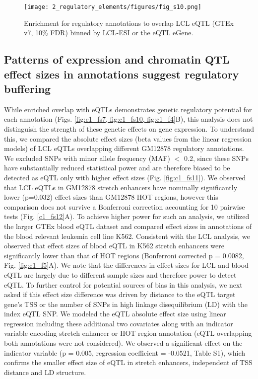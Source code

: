 \begin{figure}
    \centering
    \texttt{[image: 2\_regulatory\_elements/figures/fig\_s10.png]}
    \caption{Enrichment for regulatory annotations to overlap LCL eQTL (GTEx v7, 10\% FDR) binned by LCL-ESI or the eQTL eGene.}
    \label{fig:c1_fs10}
\end{figure}

\subsection{Patterns of expression and chromatin QTL effect sizes in annotations suggest regulatory buffering}
While enriched overlap with eQTLs demonstrates genetic regulatory potential for each annotation (Figs. \ref{fig:c1_fs7, fig:c1_fs10, fig:c1_f4}B), this analysis does not distinguish the strength of these genetic effects on gene expression. To understand this, we compared the absolute effect sizes (beta values from the linear regression models) of LCL eQTLs overlapping different GM12878 regulatory annotations. We excluded SNPs with minor allele frequency (MAF) $<$ 0.2, since these SNPs have substantially reduced statistical power and are therefore biased to be detected as eQTL only with higher effect sizes (Fig. \ref{fig:c1_fs11}). We observed that LCL eQTLs in GM12878 stretch enhancers have nominally significantly lower (p=0.032) effect sizes than GM12878 HOT regions, however this comparison does not survive a Bonferroni correction accounting for 10 pairwise tests (Fig. \ref{c1_fs12}A). To achieve higher power for such an analysis, we utilized the larger GTEx blood eQTL dataset and compared effect sizes in annotations of the blood relevant leukemia cell line K562. Consistent with the LCL analysis, we observed that effect sizes of blood eQTL in K562 stretch enhancers were significantly lower than that of HOT regions (Bonferroni corrected p = 0.0082, Fig. \ref{fig:c1_f5}A). We note that the differences in effect sizes for LCL and blood eQTL are largely due to different sample sizes and therefore power to detect eQTL. To further control for potential sources of bias in this analysis, we next asked if this effect size difference was driven by distance to the eQTL target gene’s TSS or the number of SNPs in high linkage disequilibrium (LD) with the index eQTL SNP. We modeled the eQTL absolute effect size using linear regression including these additional two covariates along with an indicator variable encoding stretch enhancer or HOT region annotation (eQTL overlapping both annotations were not considered). We observed a significant effect on the indicator variable (p = 0.005, regression coefficient = -0.0521, Table S1), which confirms the smaller effect size of eQTL in stretch enhancers, independent of TSS distance and LD structure. \\

